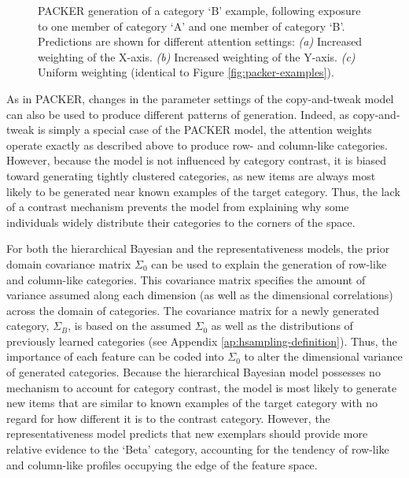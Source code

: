 \documentclass[12pt]{article}
\newcommand\inputpgf[2]{{
\let\pgfimageWithoutPath\pgfimage
\renewcommand{\pgfimage}[2][]{\pgfimageWithoutPath[##1]{#1/##2}}

}}
\begin{document}
\begin{flushleft}
\begin{figure}
    \begin{center} \inputpgf{figs/}{packer-attention-examples.pgf}
    \caption{PACKER generation of a category `B' example, following exposure to
one member of category `A' and one member of category `B'. Predictions are shown
for different attention settings: {\em (a)} Increased weighting of the X-axis.
{\em (b)} Increased weighting of the Y-axis. {\em (c)} Uniform weighting
(identical to Figure \ref{fig:packer-examples}).}
    \label{fig:packer-attention}
    \end{center}
\end{figure}

As in PACKER, changes in the parameter settings of the copy-and-tweak model can
also be used to produce different patterns of generation. Indeed, as
copy-and-tweak is simply a special case of the PACKER model, the attention
weights operate exactly as described above to produce row- and column-like
categories. However, because the model is not influenced by category contrast,
it is biased toward generating tightly clustered categories, as new items are
always most likely to be generated near known examples of the target category.
Thus, the lack of a contrast mechanism prevents the model from explaining why
some individuals widely distribute their categories to the corners of the space.

For both the hierarchical Bayesian and the representativeness models, the prior
domain covariance matrix $\Sigma_0$ can be used to explain the generation of
row-like and column-like categories. This covariance matrix specifies the amount
of variance assumed along each dimension (as well as the dimensional
correlations) across the domain of categories. The covariance matrix for a newly
generated category, $\Sigma_B$, is based on the assumed $\Sigma_0$ as well as
the distributions of previously learned categories (see Appendix
\ref{ap:hsampling-definition}). Thus, the importance of each feature can be
coded into $\Sigma_0$ to alter the dimensional variance of generated categories.
Because the hierarchical Bayesian model possesses no mechanism to account for
category contrast, the model is most likely to generate new items that are
similar to known examples of the target category with no regard for how
different it is to the contrast category. However, the representativeness model
predicts that new exemplars should provide more relative evidence to the `Beta'
category, accounting for the tendency of row-like and column-like profiles
occupying the edge of the feature space.


\end{flushleft}
\end{document}
